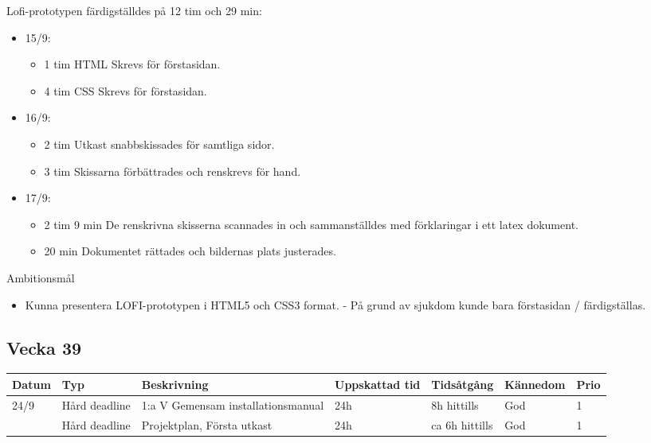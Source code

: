 \documentclass{TDP003mall}
\begin{document}
Lofi-prototypen färdigställdes på 12 tim och 29 min:
\begin{itemize}
	\item 15/9:
	\begin{itemize}
		\item 1 tim HTML Skrevs för förstasidan.
		\item 4 tim CSS Skrevs för förstasidan.
	\end{itemize}
	\item 16/9:
	\begin{itemize}
		\item 2 tim Utkast snabbskissades för samtliga sidor.
		\item 3 tim Skissarna förbättrades och renskrevs för hand.
	\end{itemize}
	\item 17/9:
	\begin{itemize}
		\item 2 tim 9 min De renskrivna skisserna scannades in och sammanställdes med förklaringar i ett latex dokument.
		\item 20 min Dokumentet rättades och bildernas plats justerades.\\
	\end{itemize}
\end{itemize}


Ambitionsmål
\begin{itemize}
  \item Kunna presentera LOFI-prototypen i HTML5 och CSS3 format. - På grund av sjukdom kunde bara förstasidan / färdigställas.
  \end{itemize}
  
\newpage


  
\subsection{Vecka 39}
\begin{tabularx}{\linewidth}{|l|l|X|l|l|l|l|}
	\hline
	Datum & Typ           & Beskrivning                        & Uppskattad tid & Tidsåtgång     & Kännedom & Prio \\ [0.5ex]
	\hline                                     
	24/9  & Hård deadline & 1:a V Gemensam installationsmanual & 24h            & 8h hittills    & God      & 1    \\
	\hline                                     
          & Hård deadline & Projektplan, Första utkast         & 24h            & ca 6h hittills & God      & 1    \\
	\hline
\end{tabularx}
\end{document}
